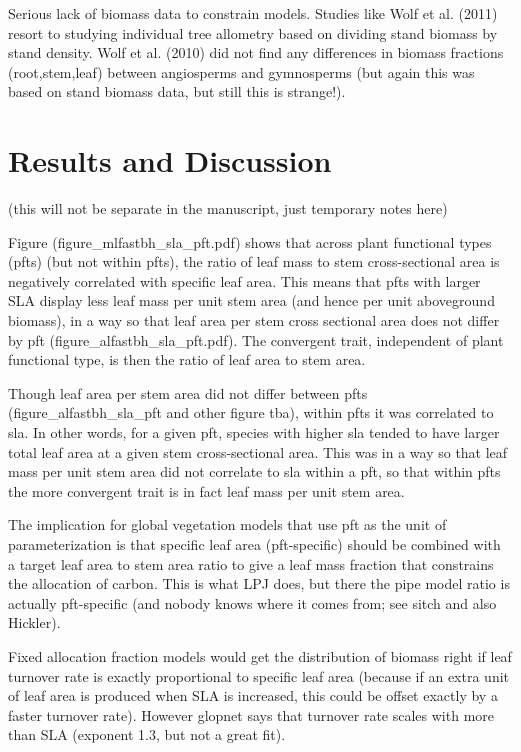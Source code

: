 \documentclass[a4paper]{article}
\begin{document}
Serious lack of biomass data to constrain models. Studies like Wolf et al. (2011) resort to studying individual tree allometry based on dividing stand biomass by stand density. Wolf et al. (2010) did not find any differences in biomass fractions (root,stem,leaf) between angiosperms and gymnosperms (but again this was based on stand biomass data, but still this is strange!).


\section{Results and Discussion}
(this will not be separate in the manuscript, just temporary notes here)

Figure (figure\_mlfastbh\_sla\_pft.pdf) shows that across plant functional types (pfts) (but not within pfts), the ratio of leaf mass to stem cross-sectional area is negatively correlated with specific leaf area. This means that pfts with larger SLA display less leaf mass per unit stem area (and hence per unit aboveground biomass), in a way so that leaf area per stem cross sectional area does not differ by pft (figure\_alfastbh\_sla\_pft.pdf). The convergent trait, independent of plant functional type, is then the ratio of leaf area to stem area.

Though leaf area per stem area did not differ between pfts (figure\_alfastbh\_sla\_pft and other figure tba), within pfts it was correlated to sla. In other words, for a given pft, species with higher sla tended to have larger total leaf area at a given stem cross-sectional area. This was in a way so that leaf mass per unit stem area did not correlate to sla within a pft, so that within pfts the more convergent trait is in fact leaf mass per unit stem area.

The implication for global vegetation models that use pft as the unit of parameterization is that specific leaf area (pft-specific) should be combined with a target leaf area to stem area ratio to give a leaf mass fraction that constrains the allocation of carbon. This is what LPJ does, but there the pipe model ratio is actually pft-specific (and nobody knows where it comes from; see sitch and also Hickler).

Fixed allocation fraction models would get the distribution of biomass right if leaf turnover rate is exactly proportional to specific leaf area (because if an extra unit of leaf area is produced when SLA is increased, this could be offset exactly by a faster turnover rate). However glopnet says that turnover rate scales with more than SLA (exponent 1.3, but not a great fit). 
\end{document}
